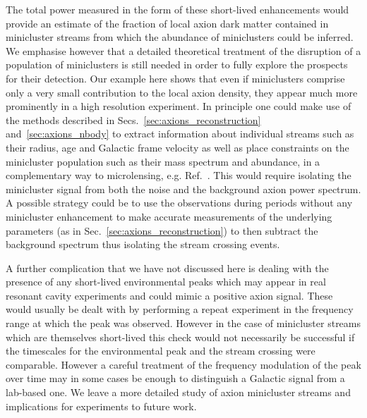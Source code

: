 The total power measured in the form of these short-lived enhancements would provide an estimate of the fraction of local axion dark matter contained in minicluster streams from which the abundance of miniclusters could be inferred. We emphasise however that a detailed theoretical treatment of the disruption of a population of miniclusters is still needed in order to fully explore the prospects for their detection. Our example here shows that even if miniclusters comprise only a very small contribution to the local axion density, they appear much more prominently in a high resolution experiment. In principle one could make use of the methods described in Secs.~\ref{sec:axions_reconstruction} and~\ref{sec:axions_nbody} to extract information about individual streams such as their radius, age and Galactic frame velocity as well as place constraints on the minicluster population such as their mass spectrum and abundance, in a complementary way to microlensing, e.g. Ref.~\cite{Fairbairn:2017dmf}. This would require isolating the minicluster signal from both the noise and the background axion power spectrum. A possible strategy could be to use the observations during periods without any minicluster enhancement to make accurate measurements of the underlying parameters (as in Sec.~\ref{sec:axions_reconstruction}) to then subtract the background spectrum thus isolating the stream crossing events. 

A further complication that we have not discussed here is dealing with the presence of any short-lived environmental peaks which may appear in real resonant cavity experiments and could mimic a positive axion signal. These would usually be dealt with by performing a repeat experiment in the frequency range at which the peak was observed. However in the case of minicluster streams which are themselves short-lived this check would not necessarily be successful if the timescales for the environmental peak and the stream crossing were comparable. However a careful treatment of the frequency modulation of the peak over time may in some cases be enough to distinguish a Galactic signal from a lab-based one. We leave a more detailed study of axion minicluster streams and implications for experiments to future work.

